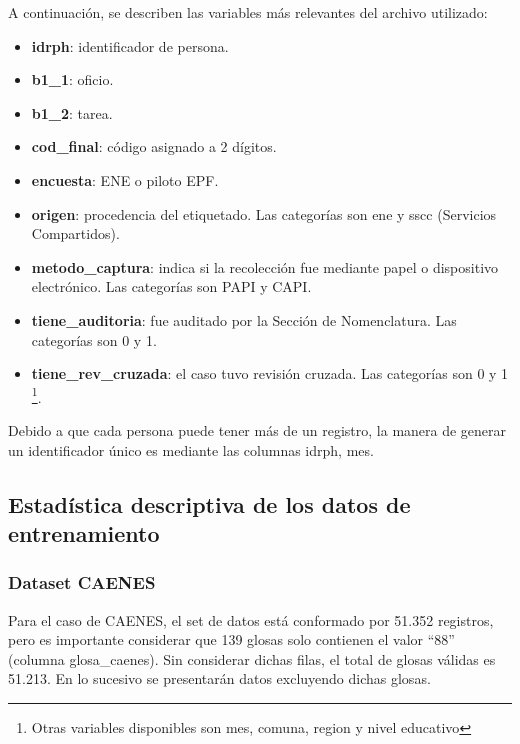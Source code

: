 \documentclass[
  12pt,
  spanish,
]{article}
\providecommand{\tightlist}{%
  \setlength{\itemsep}{0pt}\setlength{\parskip}{0pt}}
\begin{document}
A continuación, se describen las variables más relevantes del archivo
utilizado:

\begin{itemize}
\tightlist
\item
  \textbf{idrph}: identificador de persona.
\item
  \textbf{b1\_1}: oficio.
\item
  \textbf{b1\_2}: tarea.
\item
  \textbf{cod\_final}: código asignado a 2 dígitos.
\item
  \textbf{encuesta}: ENE o piloto EPF.
\item
  \textbf{origen}: procedencia del etiquetado. Las categorías son ene y
  sscc (Servicios Compartidos).
\item
  \textbf{metodo\_captura}: indica si la recolección fue mediante papel
  o dispositivo electrónico. Las categorías son PAPI y CAPI.
\item
  \textbf{tiene\_auditoria}: fue auditado por la Sección de
  Nomenclatura. Las categorías son 0 y 1.
\item
  \textbf{tiene\_rev\_cruzada}: el caso tuvo revisión cruzada. Las
  categorías son 0 y 1
  \footnote{Otras variables disponibles son mes, comuna, region y nivel educativo}.
\end{itemize}

Debido a que cada persona puede tener más de un registro, la manera de
generar un identificador único es mediante las columnas idrph, mes.

\hypertarget{estaduxedstica-descriptiva-de-los-datos-de-entrenamiento}{%
\subsection{Estadística descriptiva de los datos de
entrenamiento}\label{estaduxedstica-descriptiva-de-los-datos-de-entrenamiento}}

\hypertarget{dataset-caenes-1}{%
\subsubsection{Dataset CAENES}\label{dataset-caenes-1}}

Para el caso de CAENES, el set de datos está conformado por 51.352
registros, pero es importante considerar que 139 glosas solo contienen
el valor ``88'' (columna glosa\_caenes). Sin considerar dichas filas, el
total de glosas válidas es 51.213. En lo sucesivo se presentarán datos
excluyendo dichas glosas.
\end{document}
